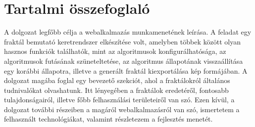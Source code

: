 \chapter*{Tartalmi összefoglaló}
A dolgozat legfőbb célja a webalkalmazás munkamenetének leírása. A feladat egy fraktál bemutató keretrendszer elkészítése volt, amelyben többek között olyan hasznos funkciók találhatók, mint az algoritmusok konfigurálhatósága, az algoritmusok futásának szüneteltetése, az algoritmus állapotának visszaállítása egy korábbi állapotra, illetve a generált fraktál kiexportálása kép formájában. A dolgozat magába foglal egy bevezető szekciót, ahol a fraktálokról általános tudnivalókat olvashatunk. Itt lényegében a fraktálok eredetéről, fontosabb tulajdonságairól, illetve főbb felhasználási területeiről van szó. Ezen kívül, a dolgozat további részeiben a magáról webalkalmazásról van szó, ismertetem a felhasznált technológiákat, valamint részletezem a fejlesztés menetét.